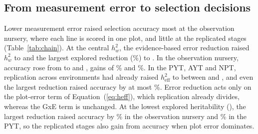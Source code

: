 \subsection{From measurement error to selection decisions}\label{sec:res_chain}

Lower measurement error raised selection accuracy most at the observation nursery, where each line is scored in one plot, and little at the replicated stages (Table~\ref{tab:chain}). At the central $h^2_w$, the evidence-based error reduction raised $h^2_w$ to \NumChainHtwoPlotErrTen and the largest explored reduction (\NumCfgErrRedMax\%) to \NumChainHtwoPlotErrFifty. In the observation nursery, accuracy rose from \NumChainAccONMan to \NumChainAccONErrTen and \NumChainAccONErrFifty, gains of \NumChainAccRelONErrTen\% and \NumChainAccRelONErrFifty\%. In the PYT, AYT and NPT, replication across environments had already raised $h^2_{\mathrm{eff}}$ to between \NumChainHtwoAYTMan and \NumChainHtwoNPTMan, and even the largest reduction raised accuracy by at most \NumChainAccRelAYTErrFifty\%. Error reduction acts only on the plot-error term of Equation~(\ref{eq:heff}), which replication already divides, whereas the GxE term is unchanged. At the lowest explored heritability (\NumCfgRobHtwoLow), the largest reduction raised accuracy by \NumChainLowAccRelONErrFifty\% in the observation nursery and \NumChainLowAccRelPYTErrFifty\% in the PYT, so the replicated stages also gain from accuracy when plot error dominates.

